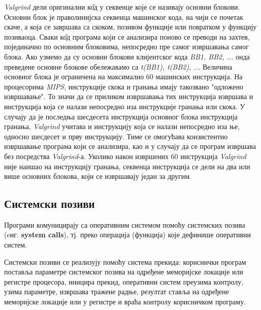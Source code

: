 \documentclass[12pt,oneside]{memoir}
\begin{document}
\indent \textit{Valgrind} дели оригинални к\^{о}д у секвенце које се називају основни блокови. Основни блок је праволинијска секвенца машинског кода, на чији се почетак скаче, а која се завршава са скоком, позивом функције или повратком у функцију позиваоца. Сваки к\^{о}д програма који се анализира поново се преводи на захтев, појединачно по основним блоковима, непосредно пре самог извршавања самог блока. Ако узмемо да су основни блокови клијентског кода \textit{BB1, BB2, ...} онда преведене основне блокове обележавамо са \textit{t(BB1), t(BB2), ...} Величина основног блока је ограничена на максимално 60 машинских инструкција. На процесорима \textit{MIPS}, инструкције скока и гранања имају такозвано "одложено извршавање". То значи да се приликом извршавања тих инструкција извршава и инструкција која се налази непосредно иза инструкције гранања или скока. У случају да је последња шесдесета инструкција основног блока инструкција гранања, \textit{Valgrind} учитава и инструкцију која се налази непосредно иза ње, односно шесдесет и прву инструкцију. Тиме се омогућава конзистентно извршавање програма који се анализира, као и у случају да се програм извршава без посредства \textit{Valgrind}-а. Уколико након извршених 60 инструкција \textit{Valgrind} није наишао на инструкцију гранања, секвенца инструкција се дели на два или више основних блокова, који се извршавају један за другим.



\subsection{Системски позиви}

\indent Програми комуницирају са оперативним системом помоћу системских позива (eнг. \textbf{system calls}), тј. преко операција (функција) које дефинише оперативни систем.

\indent Системски позиви се реализују помоћу система прекида: кориснички програм поставља параметре системског позива на одређене меморијске локације или регистре процесора, иницира прекид, оперативни систем преузима контролу, узима параметре, извршава тражене радње, резултат ставља на одређене меморијске локације или у регистре и враћа контролу корисничком програму.
\end{document}
